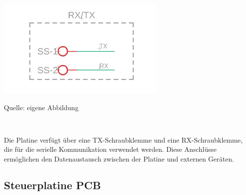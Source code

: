 \documentclass[ngerman,12pt,a4paper]{article}
\begin{document}
	\begin{center} 
		\begin{minipage}[t]{0.45\textwidth}
			\includegraphics{Pictures/RXTX}
			\label{fig:RXTX}
			\vspace{-10pt}
			\begin{center}
				\par\small Quelle: eigene Abbildung
			\end{center}
		\end{minipage} \\[0.75cm]
	\end{center}
	Die Platine verfügt über eine TX-Schraubklemme und eine RX-Schraubklemme, die für die serielle Kommunikation verwendet werden. Diese Anschlüsse ermöglichen den Datenaustausch zwischen der Platine und externen Geräten.
	\newpage
	
	\subsection{Steuerplatine PCB}
	
\end{document}
